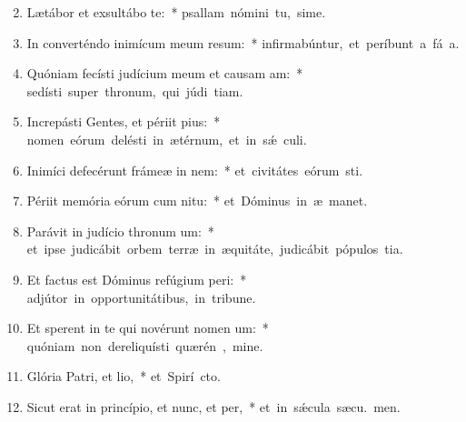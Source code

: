 \begin{flushleft}
\begin{enumerate}[leftmargin=*]
\setcounter{enumi}{1}

\item Lætábor et exsultábo  te:~* \mbox{psallam nómini tu, sime.}

\item In converténdo inimícum meum resum:~* \mbox{infirmabúntur, et períbunt a fá a.}

\item Quóniam fecísti judícium meum et causam am:~* \mbox{sedísti super thronum, qui júdi tiam.}

\item Increpásti Gentes, et périit pius:~* \mbox{nomen eórum delésti in ætérnum, et in s\'{\ae} culi.}

\item Inimíci defecérunt frámeæ in nem:~* \mbox{et civitátes eórum sti.}

\item Périit memória eórum cum nitu:~* \mbox{et Dóminus in æ manet.}

\item Parávit in judício thronum um:~* \mbox{et ipse judicábit orbem terræ in æquitáte, judicábit pópulos  tia.}

\item Et factus est Dóminus refúgium peri:~* \mbox{adjútor in opportunitátibus, in tribune.}

\item Et sperent in te qui novérunt nomen um:~* \mbox{quóniam non dereliquísti quærén , mine.}

\item Glória Patri, et lio,~* \mbox{et Spirí cto.}

\item Sicut erat in princípio, et nunc, et per,~* \mbox{et in s\'{\ae}cula sæcu. men.}



\end{enumerate}
\end{flushleft}

